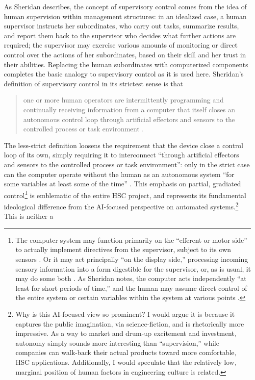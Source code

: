 As Sheridan describes, the concept of
supervisory control comes from
the idea of human supervision within management structures:  in an idealized
case, a human
supervisor instructs her subordinates, who carry out tasks, summarize
results, and report them back to the supervisor who decides what
further actions are required; the supervisor may
exercise various amounts of monitoring or direct control over the
actions of her subordinates, based on their skill and her trust in
their abilities. Replacing the human subordinates with computerized
components completes the basic analogy to supervisory control as it is
used here. Sheridan's definition of supervisory control in its
strictest sense is that
\begin{quote}one or more human operators are intermittently
  programming and continually receiving information from a computer
  that itself closes an autonomous control loop through artificial
  effectors and sensors to the controlled process or task
  environment \cite[p. 1]{sheridan}.\end{quote}
The less-strict definition loosens the requirement that the device
close a control loop of its own, simply requiring it to interconnect
``through artificial effectors and sensors to the controlled process
or task environment'':  only in the strict case can the computer
operate without the human as an autonomous system ``for some
variables at least some of the time'' \cite[p. 1]{sheridan}. This
emphasis on partial, gradiated control\footnote{The computer system
  may function primarily on the ``efferent or motor side'' to actually
implement directives from the supervisor, subject to its own
sensors \cite[p. 3]{sheridan}. Or it may act principally ``on the
display side,'' processing incoming sensory information into a form
digestible for the supervisor, or, as is usual, it may do some
both \cite[p. 3]{sheridan}. As Sheridan notes, the computer acts
independently ``at least for short periods of time,'' and the human
may assume direct control of the entire system or certain variables
within the system at various points \cite[p. 3]{sheridan}.} is
emblematic of the entire HSC 
project, and represents its fundamental ideological difference from
the AI-focused perspective on automated systems.\footnote{Why is this
  AI-focused view so prominent? I would argue it is because it
  captures the public imagination, via science-fiction, and is
  rhetorically more impressive. As a way to market and drum-up
  excitement and investment, autonomy simply sounds more interesting
  than ``supervision,'' while companies can walk-back their actual
  products toward more comfortable, HSC applications. Additionally, I
  would speculate that the relatively low, marginal position of human
  factors in engineering culture is related.} This is neither a
